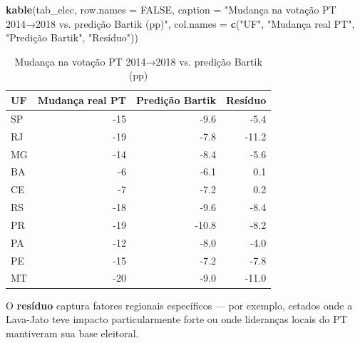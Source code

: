\documentclass[
]{article}
\newenvironment{Shaded}{\begin{snugshade}}{\end{snugshade}}
\newcommand{\AttributeTok}[1]{\textcolor[rgb]{0.13,0.29,0.53}{#1}}
\newcommand{\ConstantTok}[1]{\textcolor[rgb]{0.56,0.35,0.01}{#1}}
\newcommand{\FunctionTok}[1]{\textcolor[rgb]{0.13,0.29,0.53}{\textbf{#1}}}
\newcommand{\NormalTok}[1]{#1}
\newcommand{\StringTok}[1]{\textcolor[rgb]{0.31,0.60,0.02}{#1}}
\begin{document}
\begin{Shaded}
\begin{Highlighting}[]
\FunctionTok{kable}\NormalTok{(tab\_elec, }\AttributeTok{row.names =} \ConstantTok{FALSE}\NormalTok{,}
      \AttributeTok{caption =} \StringTok{"Mudança na votação PT 2014→2018 vs. predição Bartik (pp)"}\NormalTok{,}
      \AttributeTok{col.names =} \FunctionTok{c}\NormalTok{(}\StringTok{"UF"}\NormalTok{, }\StringTok{"Mudança real PT"}\NormalTok{, }\StringTok{"Predição Bartik"}\NormalTok{, }\StringTok{"Resíduo"}\NormalTok{))}
\end{Highlighting}
\end{Shaded}

\begin{table}

\caption{\label{tab:eleicoes-bartik}Mudança na votação PT 2014→2018 vs. predição Bartik (pp)}
\centering
\begin{tabular}[t]{l|r|r|r}
\hline
UF & Mudança real PT & Predição Bartik & Resíduo\\
\hline
SP & -15 & -9.6 & -5.4\\
\hline
RJ & -19 & -7.8 & -11.2\\
\hline
MG & -14 & -8.4 & -5.6\\
\hline
BA & -6 & -6.1 & 0.1\\
\hline
CE & -7 & -7.2 & 0.2\\
\hline
RS & -18 & -9.6 & -8.4\\
\hline
PR & -19 & -10.8 & -8.2\\
\hline
PA & -12 & -8.0 & -4.0\\
\hline
PE & -15 & -7.2 & -7.8\\
\hline
MT & -20 & -9.0 & -11.0\\
\hline
\end{tabular}
\end{table}

O \textbf{resíduo} captura fatores regionais específicos --- por exemplo, estados onde a Lava-Jato teve impacto particularmente forte ou onde lideranças locais do PT mantiveram sua base eleitoral.
\end{document}
